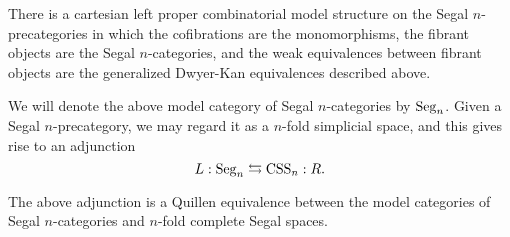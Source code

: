 \documentclass[a4paper]{amsart}
\begin{document}
\begin{theorem} %
	There is a cartesian left proper combinatorial model structure on the Segal $n$-precategories in which the cofibrations are the monomorphisms, the fibrant objects are the Segal $n$-categories, and the weak equivalences between fibrant objects are the generalized Dwyer-Kan equivalences described above. 
\end{theorem}

\noindent We will denote the above model category of Segal $n$-categories by $\mathrm{Seg}_n$.   Given a Segal $n$-precategory, we may regard it as a $n$-fold simplicial space, and this gives rise to an adjunction 
\begin{equation} \label{Eqn-SegCSS}
	L:\mathrm{Seg}_n \leftrightarrows \mathrm{CSS}_n:R.
\end{equation}
\begin{theorem} \label{thm:SegnCSSnQuillenEquiv}
	The above adjunction is a Quillen equivalence between the model categories of Segal $n$-categories and $n$-fold complete Segal spaces. 
\end{theorem}
\end{document}
